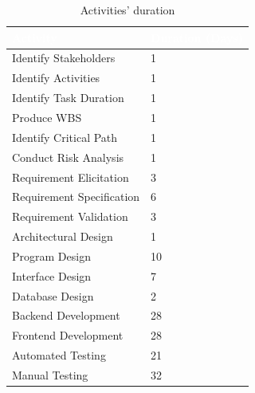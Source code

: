 \renewcommand{\arraystretch}{1.5}
\begin{table}[H]
\centering
\caption{Activities' duration}
\begin{tabular}{|p{9.0cm}|p{5.5cm}|} 
\hline
\rowcolor[rgb]{0.122,0.22,0.392} \textbf{\textcolor{white}{Activity}} & \textbf{\textcolor{white}{Duration (Days)}}  \\ 
\hline
Identify Stakeholders                                                 & 1                                            \\ 
\hline
Identify Activities                                                   & 1                                            \\ 
\hline
Identify Task Duration                                                & 1                                            \\ 
\hline
Produce WBS                                                           & 1                                            \\ 
\hline
Identify Critical Path                                                & 1                                            \\ 
\hline
Conduct Risk Analysis                                                 & 1                                            \\ 
\hline
Requirement Elicitation                                               & 3                                            \\ 
\hline
Requirement Specification                                             & 6                                            \\ 
\hline
Requirement Validation                                                & 3                                            \\ 
\hline
Architectural Design                                                  & 1                                            \\ 
\hline
Program Design                                                        & 10                                           \\ 
\hline
Interface Design                                                      & 7                                            \\ 
\hline
Database Design                                                       & 2                                            \\ 
\hline
Backend Development                                                   & 28                                           \\ 
\hline
Frontend Development                                                  & 28                                           \\ 
\hline
Automated Testing                                                     & 21                                           \\ 
\hline
Manual Testing                                                     & 32                                           \\
\hline
\end{tabular}
\end{table}

